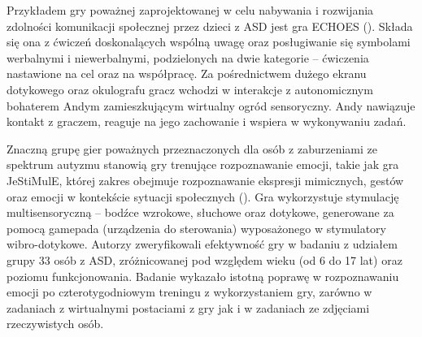     Przykładem gry poważnej zaprojektowanej w celu nabywania i rozwijania zdolności komunikacji społecznej przez dzieci z ASD jest gra ECHOES (\cite{bernardini2014echoes}).
    Składa się ona z ćwiczeń doskonalących wspólną uwagę oraz posługiwanie się symbolami werbalnymi i niewerbalnymi, podzielonych na dwie kategorie -- ćwiczenia nastawione na cel oraz na współpracę.
    Za pośrednictwem dużego ekranu dotykowego oraz okulografu gracz wchodzi w interakcje z autonomicznym bohaterem Andym zamieszkującym wirtualny ogród sensoryczny.
    Andy nawiązuje kontakt z graczem, reaguje na jego zachowanie i wspiera w wykonywaniu zadań.

    Znaczną grupę gier poważnych przeznaczonych dla osób z zaburzeniami ze spektrum autyzmu stanowią gry trenujące rozpoznawanie emocji, takie jak gra JeStiMulE, której zakres obejmuje rozpoznawanie ekspresji mimicznych, gestów oraz emocji w kontekście sytuacji społecznych (\cite{serret2014facing}).
    Gra wykorzystuje stymulację multisensoryczną -- bodźce wzrokowe, słuchowe oraz dotykowe, generowane za pomocą gamepada (urządzenia do sterowania) wyposażonego w stymulatory wibro-dotykowe.
    Autorzy zweryfikowali efektywność gry w badaniu z udziałem grupy 33 osób z ASD, zróżnicowanej pod względem wieku (od 6 do 17 lat) oraz poziomu funkcjonowania.
    Badanie wykazało istotną poprawę w rozpoznawaniu emocji po czterotygodniowym treningu z wykorzystaniem gry, zarówno w zadaniach z wirtualnymi postaciami z gry jak i w zadaniach ze zdjęciami rzeczywistych osób.
    